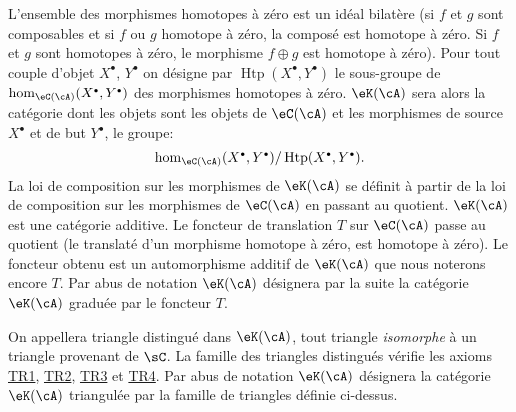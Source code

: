 L'ensemble des morphismes homotopes à zéro est un idéal bilatère (si 
$f$ et $g$ sont composables et si $f$ ou $g$ homotope à zéro, la composé 
est homotope à zéro. Si $f$ et $g$ sont homotopes à zéro, le morphisme 
$f\oplus g$ est homotope à zéro). Pour tout couple d'objet $X^\bullet$, 
$Y^\bullet$ on désigne par $\operatorname{Htp}(X^\bullet,Y^\bullet)$ le 
sous-groupe de $\hom_{\eC(\cA)}(X^\bullet,Y^\bullet)$ des morphismes homotopes 
à zéro. $\eK(\cA)$ sera alors la catégorie dont les objets sont les 
objets de $\eC(\cA)$ et les morphismes de source $X^\bullet$ et de but 
$Y^\bullet$, le groupe: 
\[
  \hom_{\eC(\cA)}(X^\bullet,Y^\bullet) / \operatorname{Htp}(X^\bullet,Y^\bullet) \text{.}
\]
La loi de composition sur les morphismes de $\eK(\cA)$ se définit à partir 
de la loi de composition sur les morphismes de $\eC(\cA)$ en passant au 
quotient. $\eK(\cA)$ est une catégorie additive. Le foncteur de translation 
$T$ sur $\eC(\cA)$ passe au quotient (le translaté d'un morphisme homotope 
à zéro, est homotope à zéro). Le foncteur obtenu est un automorphisme 
additif de $\eK(\cA)$ que nous noterons encore $T$. Par abus de notation 
$\eK(\cA)$ désignera par la suite la catégorie $\eK(\cA)$ graduée par le 
foncteur $T$. 

On appellera triangle distingué dans $\eK(\cA)$, tout triangle 
\emph{isomorphe} à un triangle provenant de $\sC$. La famille des triangles 
distingués vérifie les axioms \hyperlink{VIII:TR1}{TR1}, 
\hyperlink{VIII:TR2}{TR2}, \hyperlink{VIII:TR3}{TR3} et 
\hyperlink{VIII:TR4}{TR4}. Par abus de notation $\eK(\cA)$ désignera la 
catégorie $\eK(\cA)$ triangulée par la famille de triangles définie 
ci-dessus. 





\subsubsection{}\label{VIII:1-2-3}

